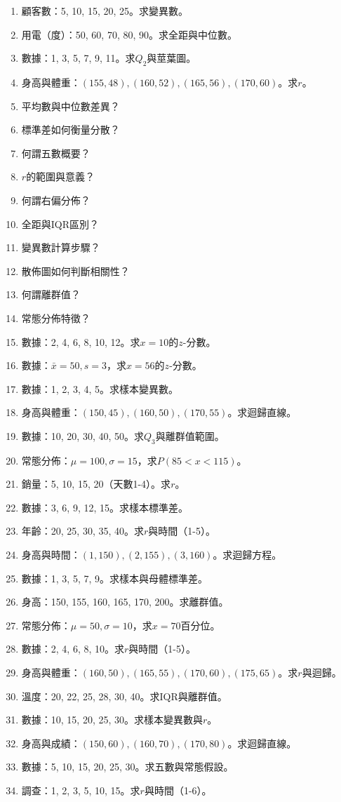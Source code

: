 \begin{enumerate}[label=\arabic*.]
    \item 顧客數：5, 10, 15, 20, 25。求變異數。
    \item 用電（度）：50, 60, 70, 80, 90。求全距與中位數。
    \item 數據：1, 3, 5, 7, 9, 11。求$Q_2$與莖葉圖。
    \item 身高與體重：$(155, 48), (160, 52), (165, 56), (170, 60)$。求$r$。
    \item 平均數與中位數差異？
    \item 標準差如何衡量分散？
    \item 何謂五數概要？
    \item $r$的範圍與意義？
    \item 何謂右偏分佈？
    \item 全距與IQR區別？
    \item 變異數計算步驟？
    \item 散佈圖如何判斷相關性？
    \item 何謂離群值？
    \item 常態分佈特徵？
    \item 數據：2, 4, 6, 8, 10, 12。求$x=10$的$z$-分數。
    \item 數據：$\bar{x}=50, s=3$，求$x=56$的$z$-分數。
    \item 數據：1, 2, 3, 4, 5。求樣本變異數。
    \item 身高與體重：$(150, 45), (160, 50), (170, 55)$。求迴歸直線。
    \item 數據：10, 20, 30, 40, 50。求$Q_3$與離群值範圍。
    \item 常態分佈：$\mu=100, \sigma=15$，求$P(85 < x < 115)$。
    \item 銷量：5, 10, 15, 20（天數1-4）。求$r$。
    \item 數據：3, 6, 9, 12, 15。求樣本標準差。
    \item 年齡：20, 25, 30, 35, 40。求$r$與時間（1-5）。
    \item 身高與時間：$(1, 150), (2, 155), (3, 160)$。求迴歸方程。
    \item 數據：1, 3, 5, 7, 9。求樣本與母體標準差。
    \item 身高：150, 155, 160, 165, 170, 200。求離群值。
    \item 常態分佈：$\mu=50, \sigma=10$，求$x=70$百分位。
    \item 數據：2, 4, 6, 8, 10。求$r$與時間（1-5）。
    \item 身高與體重：$(160, 50), (165, 55), (170, 60), (175, 65)$。求$r$與迴歸。
    \item 溫度：20, 22, 25, 28, 30, 40。求IQR與離群值。
    \item 數據：10, 15, 20, 25, 30。求樣本變異數與$r$。
    \item 身高與成績：$(150, 60), (160, 70), (170, 80)$。求迴歸直線。
    \item 數據：5, 10, 15, 20, 25, 30。求五數與常態假設。
    \item 調查：1, 2, 3, 5, 10, 15。求$r$與時間（1-6）。
\end{enumerate}